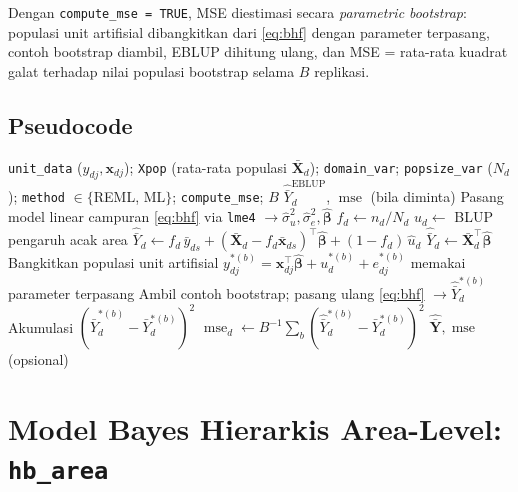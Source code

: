 \documentclass[11pt,a4paper]{article}
\theoremstyle{definition}
\begin{document}
Dengan \texttt{compute\_mse = TRUE}, MSE diestimasi secara \emph{parametric bootstrap}:
populasi unit artifisial dibangkitkan dari \eqref{eq:bhf} dengan parameter terpasang,
contoh bootstrap diambil, EBLUP dihitung ulang, dan MSE = rata-rata kuadrat galat
terhadap nilai populasi bootstrap selama $B$ replikasi.

\subsection{Pseudocode}

\begin{algorithm}[H]
\caption{\texttt{eblup\_bhf}: EBLUP Battese--Harter--Fuller berbasis unit}
\label{alg:bhf}
\begin{algorithmic}[1]
\Require \texttt{unit\_data} ($y_{dj}, \mathbf{x}_{dj}$); \texttt{Xpop} (rata-rata populasi
  $\bar{\mathbf{X}}_d$); \texttt{domain\_var}; \texttt{popsize\_var} ($N_d$);
  \texttt{method} $\in\{$REML, ML$\}$; \texttt{compute\_mse}; $B$
\Ensure $\hat{\bar{Y}}_d^{\text{EBLUP}}$, $\operatorname{mse}$ (bila diminta)
\State Pasang model linear campuran \eqref{eq:bhf} via \texttt{lme4}
  $\to \hat{\sigma}_u^2, \hat{\sigma}_e^2, \hat{\boldsymbol{\beta}}$
  \State $f_d \gets n_d / N_d$ 
  \State $\hat{u}_d \gets$ BLUP pengaruh acak area
    \State $\hat{\bar{Y}}_d \gets f_d\,\bar{y}_{ds}
      + (\bar{\mathbf{X}}_d - f_d\bar{\mathbf{x}}_{ds})^{\top}\hat{\boldsymbol{\beta}}
      + (1 - f_d)\,\hat{u}_d$ \Comment{\eqref{eq:bhf-eblup}}
  \Else
    \State $\hat{\bar{Y}}_d \gets \bar{\mathbf{X}}_d^{\top}\hat{\boldsymbol{\beta}}$
  \EndIf
\EndFor
{}
   
    \State Bangkitkan populasi unit artifisial
      $y_{dj}^{*(b)} = \mathbf{x}_{dj}^{\top}\hat{\boldsymbol{\beta}}
      + u_d^{*(b)} + e_{dj}^{*(b)}$ memakai parameter terpasang
    \State Ambil contoh bootstrap; pasang ulang \eqref{eq:bhf} $\to \hat{\bar{Y}}_d^{*(b)}$
    \State Akumulasi $(\hat{\bar{Y}}_d^{*(b)} - \bar{Y}_d^{*(b)})^2$
  \EndFor
  \State $\operatorname{mse}_d \gets B^{-1}\sum_b
    (\hat{\bar{Y}}_d^{*(b)} - \bar{Y}_d^{*(b)})^2$
\EndIf
\State \Return $\hat{\bar{\mathbf{Y}}}, \operatorname{mse}$ (opsional)
\end{algorithmic}
\end{algorithm}

\section{Model Bayes Hierarkis Area-Level: \texttt{hb\_area}}
\end{document}
